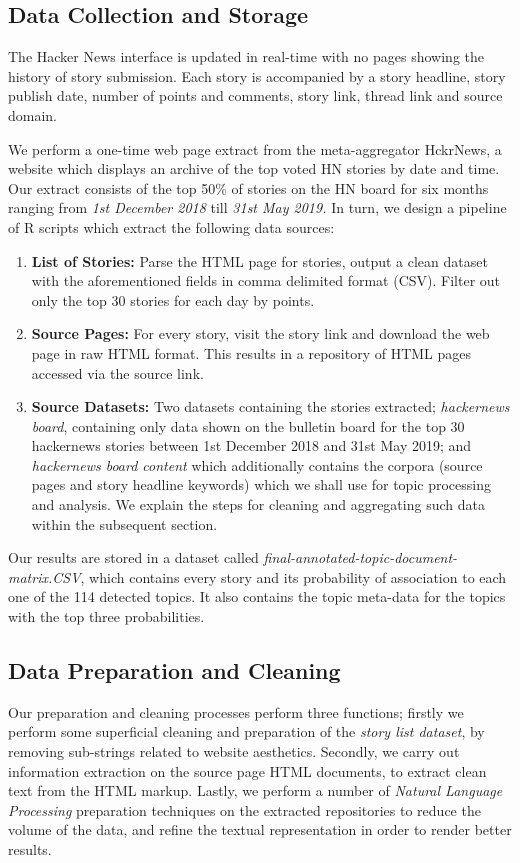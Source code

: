 \documentclass[11pt,journal,final,a4paper]{IEEEtran}
\begin{document}
\subsection{Data Collection and Storage}
The Hacker News interface is updated in real-time with no pages showing the history of story submission. Each story is accompanied by a story headline, story publish date, number of points and comments, story link, thread link and source domain.

We perform a one-time web page extract from the meta-aggregator HckrNews\cite{hn:datasource}, a website which displays an archive of the top voted HN stories by date and time. Our extract consists of the top 50\% of stories on the HN board for six months ranging from \textit{1st December 2018} till \textit{31st May 2019.} 
In turn, we design a pipeline of R scripts which extract the following data sources:
\begin{enumerate}
\item \textbf{List of Stories:} Parse the HTML page for stories, output a clean dataset with the aforementioned fields in comma delimited format (CSV). Filter out only the top 30 stories for each day by points.
\item \textbf{Source Pages:} For every story, visit the story link and download the web page in raw HTML format. This results in a repository of HTML pages accessed via the source link.
\item \textbf{Source Datasets:} Two datasets containing the stories extracted;  \textit{hackernews board}, containing only data shown on the bulletin board for the top 30 hackernews stories between 1st December 2018 and 31st May 2019; and \textit{hackernews board content} which additionally contains the corpora (source pages and story headline keywords) which we shall use for topic processing and analysis. We explain the steps for cleaning and aggregating such data within the subsequent section.
\end{enumerate} 

Our results are stored in a dataset called \textit{final-annotated-topic-document-matrix.CSV}, which contains every story and its probability of association to each one of the 114 detected topics. It also contains the topic meta-data for the topics with the top three probabilities.

\subsection{Data Preparation and Cleaning}
Our preparation and cleaning processes perform three functions; firstly we perform some superficial cleaning and preparation of the \textit{story list dataset}, by removing sub-strings related to website aesthetics. Secondly, we carry out information extraction on the source page HTML documents, to extract clean text from the HTML markup. Lastly, we perform a number of \textit{Natural Language Processing} preparation techniques on the extracted repositories to reduce the volume of the data, and refine the textual representation in order to render better results. 
\end{document}
